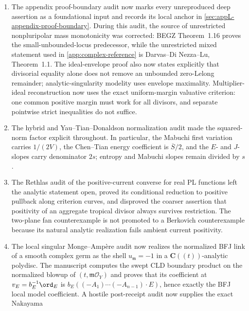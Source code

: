 \begin{enumerate}
  bidegree \((n-1,n)\) contracts the double-primed block, while \(\ddprime\)
  on bidegree \((n,n-1)\) contracts the primed block.  The simplex,
  rectangle, and balanced-face sign checks are now written out in
  \cref{chap:tropical-integration}.
\item The appendix proof-boundary audit now marks every unreproduced deep
  assertion as a foundational input and records its local anchor in
  \cref{sec:appL-appendix-proof-boundary}.  During this audit, the source of
  unrestricted nonpluripolar mass monotonicity was corrected: BEGZ
  Theorem~1.16 proves the small-unbounded-locus predecessor, while the
  unrestricted mixed statement used in \cref{app:complex-reference} is
  Darvas--Di Nezza--Lu, Theorem~1.1.  The ideal-envelope proof also now
  states explicitly that divisorial equality alone does not remove an
  unbounded zero-Lelong remainder; analytic-singularity modelity uses
  envelope maximality.  Multiplier-ideal reconstruction now uses the exact
  uniform-margin valuative criterion: one common positive margin must work
  for all divisors, and separate pointwise strict inequalities do not
  suffice.
\item The hybrid and Yau--Tian--Donaldson normalization audit made the
  squared-norm factor explicit throughout.  In particular, the Mabuchi
  first variation carries \(1/(2V)\), the Chen--Tian energy coefficient is
  \(\overline S/2\), and the \(E\)- and \(J\)-slopes carry denominator
  \(2s\); entropy and Mabuchi slopes remain divided by \(s\).
\item The Rethlas audit of the positive-current converse for real PL
  functions left the analytic statement open, proved its conditional
  reduction to positive pullback along criterion curves, and disproved the
  coarser assertion that positivity of an aggregate tropical divisor always
  survives restriction.  The two-plane fan counterexample is not promoted to
  a Berkovich counterexample because its natural analytic realization fails
  ambient current positivity.
\item The local singular Monge--Amp\`ere audit now realizes the normalized
  BFJ link of a smooth complex germ as the shell
  \(u_{\mathfrak m}=-1\) in a \(\mathbf C((t))\)-analytic polydisc.  The
  manuscript computes the swept CLD boundary product on the normalized
  blowup of \((t,\mathfrak m\mathcal O_Y)\) and proves that its coefficient at
  \(v_E=b_E^{-1}\ord_E\) is
  \(b_E((-A_1)\cdots(-A_{n-1})\cdot E)\), hence exactly the BFJ local model
  coefficient.  A hostile post-receipt audit now supplies the exact Nakayama

\end{enumerate}
